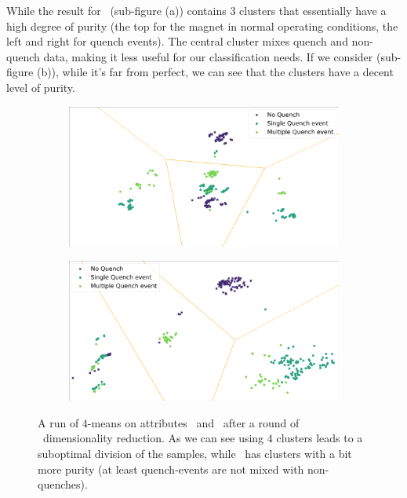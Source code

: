 While the result for \an\ (sub-figure (a)) contains $3$ clusters that essentially have a high degree
of purity (the top for the magnet in normal operating conditions, the left and right for quench
events). The central cluster mixes quench and non-quench data, making it less useful for our
classification needs. If we consider \cnmod (sub-figure (b)), while it's far from perfect, we can see
that the clusters have a decent level of purity.
\begin{figure}[!ht]
	\centering
	\begin{subfigure}{0.8\linewidth}
		\centering
		\includegraphics[width=\linewidth]{img/clustering_an_qlp_4c.png}
		\caption{}
	\end{subfigure}
	\begin{subfigure}{0.8\linewidth}
		\centering
		\includegraphics[width=\linewidth]{img/clustering_cnmod_qlp_4c.png}
		\caption{}
	\end{subfigure}
	\caption{A run of $4$-means on attributes \an{}d \cnmod\ after a round of \pca\
		dimensionality reduction. As we can see using $4$ clusters leads to a suboptimal division of
		the samples, while \cnmod\ has clusters with a bit more purity (at least quench-events are
		not mixed with non-quenches).} \label{fig:4-means-results}
\end{figure}

